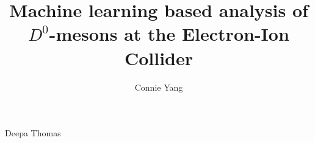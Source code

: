 \author{Connie Yang}  	%

\address{Your Email or Physical Address (for Vita)}  %

\title{Machine learning based analysis of $D^0$-mesons at the Electron-Ion Collider} %


%
%
%
%
%
%
\supervisor
	{Deepa Thomas}

%
%
%
%
%
%


